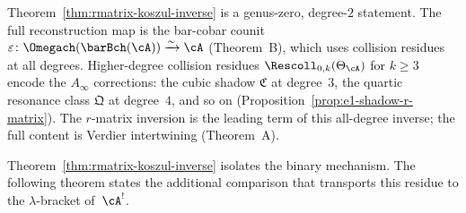 \begin{remark}
\label{rem:rmatrix-koszul-inverse-leading}
Theorem~\ref{thm:rmatrix-koszul-inverse} is a genus-zero,
degree-$2$ statement. The full reconstruction map is
the bar-cobar counit $\varepsilon\colon
\Omegach(\barBch(\cA)) \xrightarrow{\sim} \cA$
(Theorem~B), which uses collision residues at all degrees.
Higher-degree collision residues
$\Rescoll_{0,k}(\Theta_\cA)$ for $k \geq 3$ encode the
$A_\infty$ corrections: the cubic shadow $\mathfrak{C}$ at
degree~$3$, the quartic resonance class $\mathfrak{Q}$ at
degree~$4$, and so on
(Proposition~\ref{prop:e1-shadow-r-matrix}).
The $r$-matrix inversion is the leading term of this all-degree
inverse; the full content is Verdier intertwining (Theorem~A).
\end{remark}

Theorem~\ref{thm:rmatrix-koszul-inverse} isolates the binary
mechanism. The following theorem states the additional comparison
that transports this residue to the $\lambda$-bracket of~$\cA^!$.

